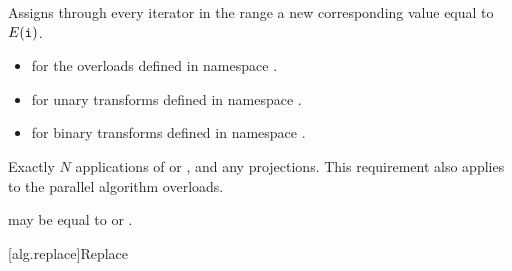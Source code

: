 \begin{itemdescr}
\pnum
\effects
Assigns through every iterator 
in the range 
a new corresponding value equal to $E(\tcode{i})$.

\pnum
\returns
\begin{itemize}
\item
  for the overloads defined in namespace .
\item
  for unary transforms defined in namespace .
\item
  for binary transforms defined in namespace .
\end{itemize}

\pnum
\complexity
Exactly $N$ applications of  or , and
any projections.
This requirement also applies to the parallel algorithm overloads.

\pnum
\remarks
{} may be equal to  or .
\end{itemdescr}

[alg.replace]{Replace}

